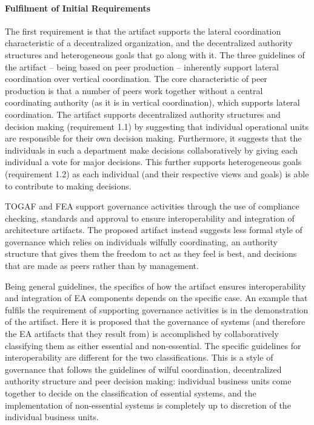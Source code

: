 \paragraph*{Fulfilment of Initial Requirements}

The first requirement is that the artifact supports the lateral coordination characteristic of a decentralized organization, and the decentralized authority structures and heterogeneous goals that go along with it. The three guidelines of the artifact -- being based on peer production -- inherently support lateral coordination over vertical coordination. The core characteristic of peer production is that a number of peers work together without a central coordinating authority (as it is in vertical coordination), which supports lateral coordination. The artifact supports decentralized authority structures and decision making (requirement 1.1) by suggesting that individual operational units are responsible for their own decision making. Furthermore, it suggests that the individuals in such a department make decisions collaboratively by giving each individual a vote for major decisions. This further supports heterogeneous goals (requirement 1.2) as each individual (and their respective views and goals) is able to contribute to making decisions.

TOGAF and FEA support governance activities through the use of compliance checking, standards and approval to ensure interoperability and integration of architecture artifacts. The proposed artifact instead suggests less formal style of governance which relies on individuals wilfully coordinating, an authority structure that gives them the freedom to act as they feel is best, and decisions that are made as peers rather than by management.

Being general guidelines, the specifics of how the artifact ensures interoperability and integration of EA components depends on the specific case. An example that fulfils the requirement of supporting governance activities is in the demonstration of the artifact. Here it is proposed that the governance of systems (and therefore the EA artifacts that they result from) is accomplished by collaboratively classifying them as either essential and non-essential. The specific guidelines for interoperability are different for the two classifications. This is a style of governance that follows the guidelines of wilful coordination, decentralized authority structure and peer decision making: individual business units come together to decide on the classification of essential systems, and the implementation of non-essential systems is completely up to discretion of the individual business units. 

